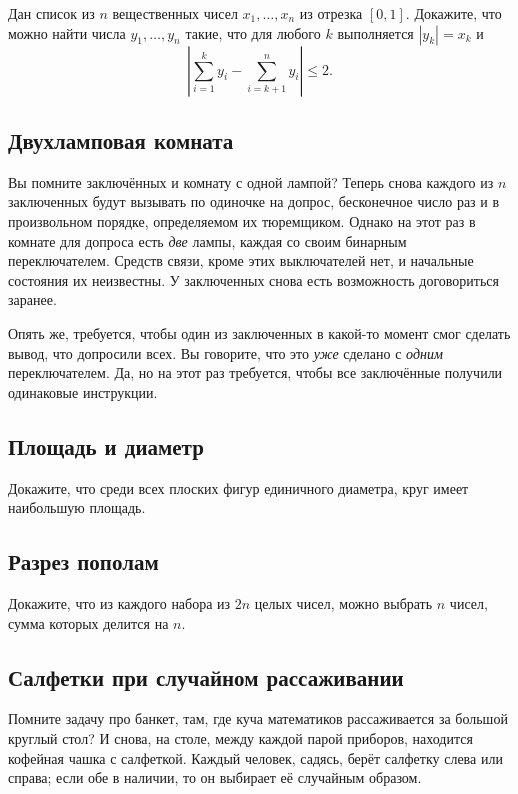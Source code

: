 Дан список из $n$ вещественных чисел $x_1,\dots,x_n$ из отрезка $[0,1]$.
Докажите, что можно найти числа $y_1,\dots,y_n$ такие, что для любого $k$ выполняется $|y_k|=x_k$ и
\[\left|\sum_{i=1}^ky_i-\sum_{i=k+1}^ny_i\right|\le 2.\]

\subsection*{Двухламповая комната}%

Вы помните заключённых и комнату с одной лампой?
Теперь снова каждого из $n$ заключенных будут вызывать по одиночке на допрос, бесконечное число раз и в произвольном порядке, определяемом их тюремщиком.
Однако на этот раз в комнате для допроса есть \emph{две} лампы, каждая со своим бинарным переключателем.
Средств связи, кроме этих выключателей нет, и начальные состояния их неизвестны.
У заключенных снова есть возможность договориться заранее.

Опять же, требуется, чтобы один из заключенных в какой-то момент смог сделать вывод, что допросили всех.
Вы говорите, что это \emph{уже} сделано с \emph{одним} переключателем.
Да, но на этот раз требуется, чтобы все заключённые получили одинаковые инструкции.

\subsection*{Площадь и диаметр}

Докажите, что среди всех плоских фигур единичного диаметра, круг имеет наибольшую площадь.

\subsection*{Разрез пополам}

Докажите, что из каждого набора из $2n$ целых чисел, можно выбрать $n$ чисел, сумма которых делится на $n$.

\subsection*{Салфетки при случайном рассаживании}

Помните задачу про банкет, там, где куча математиков рассаживается за большой круглый стол?
И снова, на столе, между каждой парой приборов, находится кофейная чашка с салфеткой.
Каждый человек, садясь, берёт салфетку слева или справа;
если обе в наличии, то он выбирает её случайным образом.


